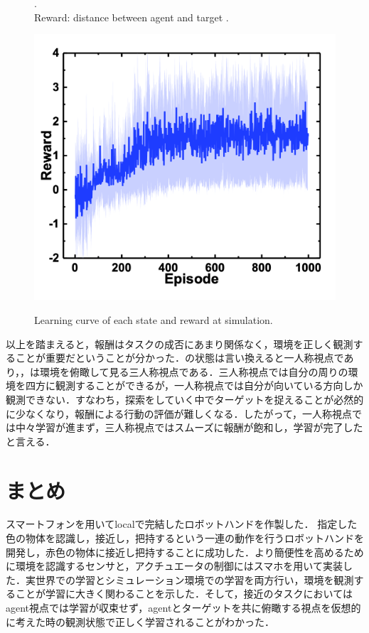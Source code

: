 \begin{figure}
\begin{minipage}{0.4\linewidth}
{. \\Reward: distance between agent and target
.}
        \label{fig:報酬距離}
    \end{minipage}
    \begin{minipage}{0.4\linewidth}
        \centering
        \includegraphics[width=0.9\linewidth]{figure/chapter3/QL_rew=redArea_obs=posvec_origin}
        \label{fig:報酬面積}
    \end{minipage}
    \caption{Learning curve of each state and reward at simulation.}
    \label{fig:シミュレーション結果}
\end{figure}

以上を踏まえると，報酬はタスクの成否にあまり関係なく，環境を正しく観測することが重要だということが分かった．の状態は言い換えると一人称視点であり，，は環境を俯瞰して見る三人称視点である．三人称視点では自分の周りの環境を四方に観測することができるが，一人称視点では自分が向いている方向しか観測できない．すなわち，探索をしていく中でターゲットを捉えることが必然的に少なくなり，報酬による行動の評価が難しくなる．したがって，一人称視点では中々学習が進まず，三人称視点ではスムーズに報酬が飽和し，学習が完了したと言える．


\section{まとめ}
スマートフォンを用いてlocalで完結したロボットハンドを作製した．
指定した色の物体を認識し，接近し，把持するという一連の動作を行うロボットハンドを開発し，赤色の物体に接近し把持することに成功した．より簡便性を高めるために環境を認識するセンサと，アクチュエータの制御にはスマホを用いて実装した．実世界での学習とシミュレーション環境での学習を両方行い，環境を観測することが学習に大きく関わることを示した．そして，接近のタスクにおいてはagent視点では学習が収束せず，agentとターゲットを共に俯瞰する視点を仮想的に考えた時の観測状態で正しく学習されることがわかった．

